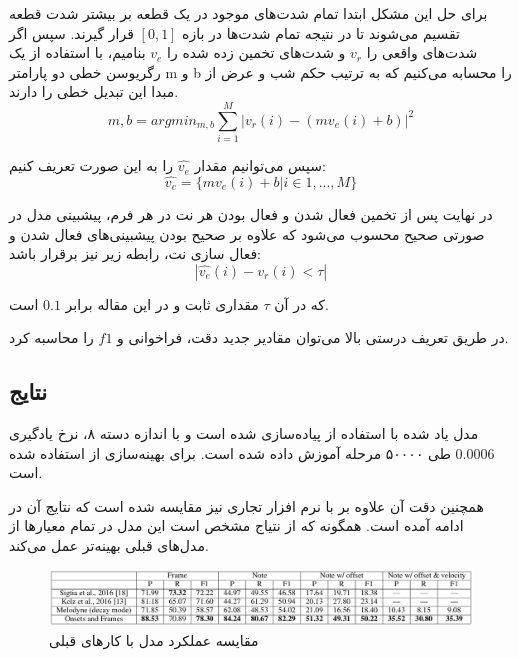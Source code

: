 برای حل این مشکل ابتدا تمام شدت‌های موجود در یک قطعه بر بیشتر شدت قطعه تقسیم
می‌شوند تا در نتیجه تمام شدت‌ها در بازه
$[0,1]$
قرار گیرند. سپس اگر شدت‌های واقعی را 
$v_r$
و شدت‌های تخمین زده شده را
$v_e$
بنامیم، با استفاده از یک رگریوسن خطی دو پارامتر
m
و
b
را محسابه می‌کنیم که به ترتیب حکم شب و عرض از مبدا این تبدیل خطی را دارند.
\begin{equation}
    m, b = argmin_{m, b} \sum_{i=1}^{M}
    | v_r(i) - (mv_e(i) + b) |^2
\end{equation}

سپس می‌توانیم مقدار
$\hat{v_e}$
را به این صورت تعریف کنیم:
\begin{equation}
    \hat{v_e} = \{ mv_e(i) + b | i \in 1, ... ,M \}
\end{equation}

در نهایت پس از تخمین فعال شدن و فعال بودن هر نت در هر فرم، پیشبینی مدل در صورتی
صحیح محسوب می‌شود که علاوه بر صحیح بودن پیشبینی‌های فعال شدن و فعال سازی نت، رابطه
زیر نیز برقرار باشد:
\begin{equation}
    | \hat{v_e}(i) - v_r(i) < \tau |
\end{equation}

که در آن
$\tau$
مقداری ثابت و در این مقاله برابر
$0.1$
است.

در طریق تعریف درستی بالا می‌توان مقادیر جدید دقت، فراخوانی و
$f1$
را محاسبه کرد.

\subsection{نتایج}
مدل یاد شده با استفاده از
پیاده‌سازی شده است
\cite{abadi2016tensorflow}
و با اندازه دسته ۸، نرخ یادگیری
$0.0006$
طی ۵۰۰۰۰ مرحله آموزش داده شده است. برای بهینه‌سازی از
\cite{kingma2014adam}
استفاده شده است. 

همچنین دقت آن علاوه بر
\cite{sigtia2016end,kelz2016potential}
با نرم افزار تجاری
نیز مقایسه شده است که نتایج آن در ادامه آمده است. همگونه که از نتیاج مشخص است
این مدل در تمام معیارها از مدل‌های قبلی بهینه‌تر عمل می‌کند.

\begin{figure}
    \includegraphics[width=\linewidth]
    {./statics/hawthorne2017onsets_results.png}
    \caption{مقایسه عملکرد مدل با کارهای قبلی}
\end{figure}

